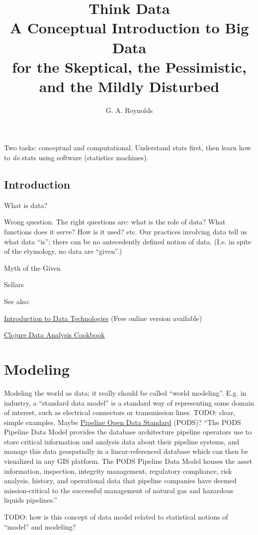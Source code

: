 \documentclass[reqno,12pt]{tufte-book}
\title{Think Data \\
\vspace{12pt}
\Large A Conceptual Introduction to Big Data \\
\vspace{12pt}
\large for the Skeptical, the Pessimistic, and the Mildly Disturbed}
\author{G. A. Reynolds}
\numberwithin{equation}{subsection}
\begin{document}
\maketitle

\begin{remark}
  Two tasks: conceptual and computational.  Understand stats first,
  then learn how to \emph{do} stats using software (statistics
  machines).
\end{remark}

\tableofcontents

\chapter{Introduction}

What is data?

Wrong question.  The right questions are: what is the role of data?
What functions does it serve?  How is it used?  etc.  Our practices
involving data tell us what data ``is''; there can be no antecedently
defined notion of data.  (I.e. in spite of the etymology, no data are
``given''.)

\epigraph{Myth of the Given}{Sellars}


See also:

\href{https://www.stat.auckland.ac.nz/~paul/ItDT/}{Introduction to Data Technologies} (Free online version available)

\href{http://www.ericrochester.com/clj-data-analysis/}{Clojure Data Analysis Cookbook}



\part{Modeling}

\begin{ednote}
  Modeling the world as data; it really should be called ``world
  modeling''.  E.g. in industry, a ``standard data model'' is a
  standard way of representing some domain of interest, such as
  electrical connectors or transmission lines.  TODO: clear, simple
  examples.  Maybe \href{http://www.pods.org/4/The PODS Data
    Model/}{Pipeline Open Data Standard} (PODS)?  ``The PODS Pipeline Data Model provides the database architecture pipeline operators use to store critical information and analysis data about their pipeline systems, and manage this data geospatially in a linear-referenced database which can then be visualized in any GIS platform.  The PODS Pipeline Data Model houses the asset information, inspection, integrity management, regulatory compliance, risk analysis, history, and operational data that pipeline companies have deemed mission-critical to the successful management of natural gas and hazardous liquids pipelines.''

  TODO: how is this concept of data model related to statistical
  notions of ``model'' and modeling?
\end{ednote}
\end{document}
